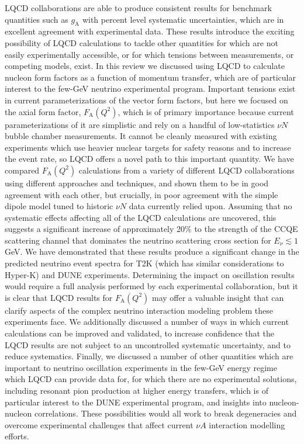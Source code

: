 LQCD collaborations are able to produce consistent results for benchmark quantities such as $g_{\mathrm{A}}$ with percent level systematic uncertainties, which are in excellent agreement with experimental data.
These results introduce the exciting possibility of LQCD calculations to tackle other quantities for which are not easily experimentally accessible, or for which tensions between measurements, or competing models, exist.
In this review we discussed using LQCD to calculate nucleon form factors as a function of momentum transfer, which are of particular interest to the few-GeV neutrino experimental program.
Important tensions exist in current parameterizations of the vector form factors, but here we focused on the axial form factor, $F_{\mathrm{A}}(Q^2)$, which is of primary importance because current parameterizations of it are simplistic and rely on a handful of low-statistics $\nu N$ bubble chamber measurements.
It cannot be cleanly measured with existing experiments which use heavier nuclear targets for safety reasons and to increase the event rate, so LQCD offers a novel path to this important quantity.
We have compared $F_{\mathrm{A}}(Q^2)$ calculations from a variety of different LQCD collaborations using different approaches and techniques, and shown them to be in good agreement with each other, but crucially, in poor agreement with the simple dipole model tuned to historic $\nu N$ data currently relied upon.
Assuming that no systematic effects affecting all of the LQCD calculations are uncovered, this suggests a significant increase of approximately 20\% to the strength of the CCQE scattering channel that dominates the neutrino scattering cross section for $E_{\nu} \lesssim 1$ GeV.
We have demonstrated that these results produce a significant change in the predicted neutrino event spectra for T2K (which has similar considerations to Hyper-K) and DUNE experiments.
Determining the impact on oscillation results would require a full analysis performed by each experimental collaboration, but it is clear that LQCD results for $F_{\mathrm{A}}(Q^2)$ may offer a valuable insight that can clarify aspects of the complex neutrino interaction modeling problem these experiments face.
We additionally discussed a number of ways in which current calculations can be improved and validated, to increase confidence that the LQCD results are not subject to an uncontrolled systematic uncertainty, and to reduce systematics.
Finally, we discussed a number of other quantities which are important to neutrino oscillation experiments in the few-GeV energy regime which LQCD can provide data for, for which there are no experimental solutions, including resonant pion production at higher energy transfers, which is of particular interest to the DUNE experimental program, and insights into nucleon-nucleon correlations.
These possibilities would all work to break degeneracies and overcome experimental challenges that affect current $\nu A$ interaction modelling efforts.

